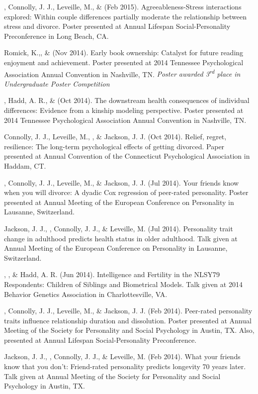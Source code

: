 \begin{etaremune}
%
\item\meb, Connolly, J. J., Leveille, M., \& \jjj (Feb 2015). Agreeableness-Stress interactions explored: Within couple differences partially moderate the relationship between stress and divorce. Poster presented at Annual Lifespan Social-Personality Preconference in Long Beach, CA.
%
\item Romick, K.,\noteA \meb, \& \joe (Nov 2014). Early book ownership: Catalyst for future reading enjoyment and achievement. Poster presented at 2014 Tennessee Psychological Association Annual Convention in  Nashville, TN. \textit{Poster awarded 3\textsuperscript{rd} place in Undergraduate Poster Competition}
%
\item\meb, Hadd, A. R., \& \joe (Oct 2014). The downstream health consequences of individual differences: Evidence from a kinship modeling perspective. Poster presented at 2014 Tennessee Psychological Association Annual Convention in Nashville, TN.
%
\item Connolly, J. J., Leveille, M., \meb, \& Jackson, J. J. (Oct 2014). Relief, regret, resilience: The long-term psychological effects of getting divorced. Paper presented at Annual Convention of the Connecticut Psychological Association in Haddam, CT.
%
\item\meb, Connolly, J. J., Leveille, M., \& Jackson, J. J. (Jul 2014). Your friends know when you will divorce: A dyadic Cox regression of peer-rated personality. Poster presented at Annual Meeting of the European Conference on Personality in Lausanne, Switzerland.
%
\item Jackson, J. J., \meb, Connolly, J. J., \& Leveille, M. (Jul 2014). Personality trait change in adulthood predicts health status in older adulthood. Talk given at Annual Meeting of the European Conference on Personality in Lausanne, Switzerland.
%
\item \joe, \meb, \& Hadd, A. R. (Jun 2014). Intelligence and Fertility in the NLSY79 Respondents: Children of Siblings and Biometrical Models. Talk given at 2014 Behavior Genetics Association in Charlottesville, VA.
%
\item\meb, Connolly, J. J., Leveille, M., \& Jackson, J. J. (Feb 2014). Peer-rated personality traits influence relationship duration and dissolution. Poster presented at Annual Meeting of the Society for Personality and Social Psychology in Austin, TX. Also, presented at Annual Lifespan Social-Personality Preconference.
%
\item Jackson, J. J., \meb, Connolly, J. J., \& Leveille, M. (Feb 2014). What your friends know that you don't: Friend-rated personality predicts longevity 70 years later. Talk given at Annual Meeting of the Society for Personality and Social Psychology in Austin, TX.
%
\end{etaremune}
